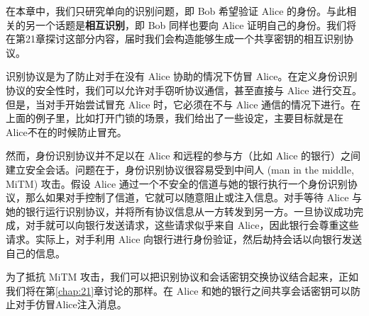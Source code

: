 \begin{snote}[单向证明与相互识别。]
在本章中，我们只研究单向的识别问题，即 Bob 希望验证 Alice 的身份。与此相关的另一个话题是\textbf{相互识别}，即 Bob 同样也要向 Alice 证明自己的身份。我们将在第21章探讨这部分内容，届时我们会构造能够生成一个共享密钥的相互识别协议。
\end{snote}

\begin{snote}[身份识别协议的安全性和局限性。]
识别协议是为了防止对手在没有 Alice 协助的情况下仿冒 Alice。在定义身份识别协议的安全性时，我们可以允许对手窃听协议通信，甚至直接与 Alice 进行交互。但是，当对手开始尝试冒充 Alice 时，它必须在不与 Alice 通信的情况下进行。在上面的例子里，比如打开门锁的场景，我们给出了一些设定，主要目标就是在Alice不在的时候防止冒充。

然而，身份识别协议并不足以在 Alice 和远程的参与方（比如 Alice 的银行）之间建立安全会话。问题在于，身份识别协议很容易受到中间人 (man in the middle, MiTM) 攻击。假设 Alice 通过一个不安全的信道与她的银行执行一个身份识别协议，那么如果对手控制了信道，它就可以随意阻止或注入信息。对手等待 Alice 与她的银行运行识别协议，并将所有协议信息从一方转发到另一方。一旦协议成功完成，对手就可以向银行发送请求，这些请求似乎来自 Alice，因此银行会尊重这些请求。实际上，对手利用 Alice 向银行进行身份验证，然后劫持会话以向银行发送自己的信息。

为了抵抗 MiTM 攻击，我们可以把识别协议和会话密钥交换协议结合起来，正如我们将在第\ref{chap:21}章讨论的那样。在 Alice 和她的银行之间共享会话密钥可以防止对手仿冒Alice注入消息。	
\end{snote}










